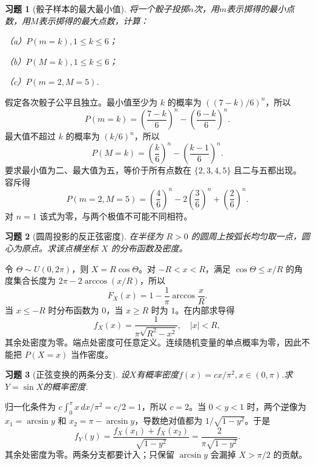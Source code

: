 \documentclass[12pt,fontset=fandol]{ctexart}
\newtheorem{exercise}{习题}[section]
\begin{document}
\begin{exercise}[骰子样本的最大最小值]\label{q:Y3.25}
将一个骰子投掷$n$次，用$m$表示掷得的最小点数，用$M$表示掷得的最大点数，计算：

（a）$P(m=k),1\leqslant k\leqslant 6$；

（b）$P(M=k),1\leqslant k\leqslant 6$；

（c）$P(m=2,M=5)$.\par{}
\end{exercise}

\begin{solve}\label{a:Y3.25}假定各次骰子公平且独立。最小值至少为 $k$ 的概率为 $((7-k)/6)^n$，所以\[P(m=k)=\left(\frac{7-k}{6}\right)^n-\left(\frac{6-k}{6}\right)^n.\]最大值不超过 $k$ 的概率为 $(k/6)^n$，所以\[P(M=k)=\left(\frac{k}{6}\right)^n-\left(\frac{k-1}{6}\right)^n.\]要求最小值为二、最大值为五，等价于所有点数在 $\{2,3,4,5\}$ 且二与五都出现。容斥得\[P(m=2,M=5)=\left(\frac46\right)^n-2\left(\frac36\right)^n+\left(\frac26\right)^n.\]对 $n=1$ 该式为零，与两个极值不可能不同相符。\end{solve}

\begin{exercise}[圆周投影的反正弦密度]\label{q:Y3.26}
在半径为 $R>0$ 的圆周上按弧长均匀取一点，圆心为原点。求该点横坐标 $X$ 的分布函数及密度。\par{}
\end{exercise}

\begin{solve}\label{a:Y3.26}令 $\Theta\sim U(0,2\pi)$，则 $X=R\cos\Theta$。对 $-R<x<R$，满足 $\cos\Theta\le x/R$ 的角度集合长度为 $2\pi-2\arccos(x/R)$，所以\[F_X(x)=1-\frac{1}{\pi}\arccos\frac{x}{R}.\]当 $x\le-R$ 时分布函数为 $0$，当 $x\ge R$ 时为 $1$。在内部求导得\[f_X(x)=\frac{1}{\pi\sqrt{R^2-x^2}},\quad |x|<R,\]其余处密度为零。端点处密度可任意定义。连续随机变量的单点概率为零，因此不能把 $P(X=x)$ 当作密度。\end{solve}

\begin{exercise}[正弦变换的两条分支]\label{q:Y3.28}
设$X$有概率密度$f(x)=cx/\pi^2,x\in (0,\pi)$.求$Y=\sin X$的概率密度.\par{}
\end{exercise}

\begin{solve}\label{a:Y3.28}归一化条件为 $c\int_0^\pi x\,dx/\pi^2=c/2=1$，所以 $c=2$。当 $0<y<1$ 时，两个逆像为 $x_1=\arcsin y$ 和 $x_2=\pi-\arcsin y$，导数绝对值都为 $1/\sqrt{1-y^2}$。于是\[f_Y(y)=\frac{f_X(x_1)+f_X(x_2)}{\sqrt{1-y^2}}=\frac{2}{\pi\sqrt{1-y^2}}.\]其余处密度为零。两条分支都要计入；只保留 $\arcsin y$ 会漏掉 $X>\pi/2$ 的贡献。\end{solve}
\end{document}
